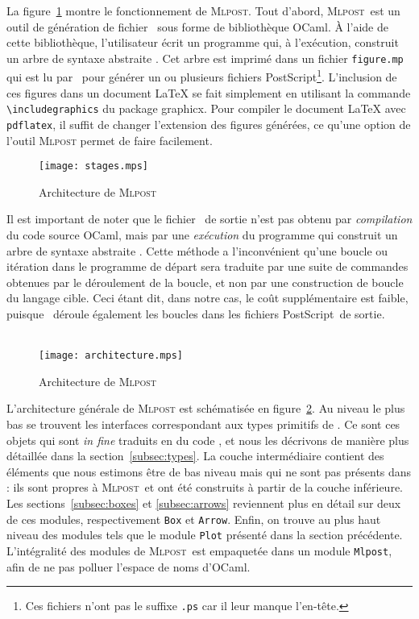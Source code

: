 \documentclass[twoside]{studia-Hermann}
\newcommand{\ocaml}{OCaml}
\newcommand{\mlpost}{\textsc{Mlpost}}
\newcommand{\metapost}{\MP}
\newcommand{\postscript}{PostScript}
\begin{document}
La figure~\ref{fig:etapes} montre le fonctionnement de \mlpost.  Tout
d'abord, \mlpost\ est un outil de génération de fichier \metapost\
sous forme de bibliothèque \ocaml. À l'aide de cette bibliothèque,
l'utilisateur écrit un programme qui, à l'exécution, construit un
arbre de syntaxe abstraite \metapost. Cet arbre est imprimé dans un
fichier \verb|figure.mp| qui est lu par \metapost\ pour générer un ou
plusieurs fichiers \postscript\footnote{Ces fichiers n'ont pas le
  suffixe \texttt{.ps} car il leur manque l'en-tête.}. L'inclusion de
ces figures dans un document \LaTeX{} se fait simplement en utilisant
la commande \verb|\includegraphics| du package \textsf{graphicx}. Pour
compiler le document \LaTeX{} avec {\tt pdflatex}, il suffit de
changer l'extension des figures générées, ce qu'une option de l'outil
\mlpost{} permet de faire facilement.

\begin{figure}[h]
\begin{center}
\texttt{[image: stages.mps]}
\end{center}
  \caption{Architecture de \mlpost}\label{fig:etapes}
\end{figure}

Il est important de noter que le fichier \metapost\ de sortie n'est
pas obtenu par {\em compilation} du code source \ocaml, mais
par une \emph{exécution} du programme qui construit un arbre de syntaxe
abstraite \metapost. Cette méthode a l'inconvénient qu'une boucle ou
itération dans le programme de départ sera traduite par une suite de
commandes obtenues par le déroulement de la boucle, et non par une
construction de boucle du langage cible. Ceci étant dit, dans notre
cas, le coût supplémentaire est faible, puisque \metapost\ déroule
également les boucles dans les fichiers \postscript\ de sortie.

\begin{figure}[ht]
  \begin{center}
    ~\\[0.5em]
    \texttt{[image: architecture.mps]} 
  \end{center}
  \vspace*{-1em}
  \caption{Architecture de \mlpost}\label{fig:archi}
\end{figure}

L'architecture générale de \mlpost{} est schématisée en
figure~\ref{fig:archi}. Au niveau le plus bas se trouvent les interfaces
correspondant aux types primitifs de \metapost. Ce sont ces objets qui sont
{\it in fine} traduits en du code \metapost, et nous les décrivons de manière
plus détaillée dans la section~\ref{subsec:types}. La couche intermédiaire
contient des éléments que nous estimons être de bas niveau mais qui ne sont
pas présents dans \metapost : ils sont propres à \mlpost\ et ont été
construits à partir de la couche inférieure. Les sections~\ref{subsec:boxes}
et \ref{subsec:arrows} reviennent plus en détail sur deux de ces modules,
respectivement \texttt{Box} et \texttt{Arrow}.
Enfin, on trouve au plus haut niveau des modules tels que
le module \texttt{Plot} présenté dans la section précédente.
L'intégralité des modules de \mlpost\ est empaquetée dans un module
\texttt{Mlpost}, afin de ne pas polluer l'espace de noms d'\ocaml.
\end{document}
